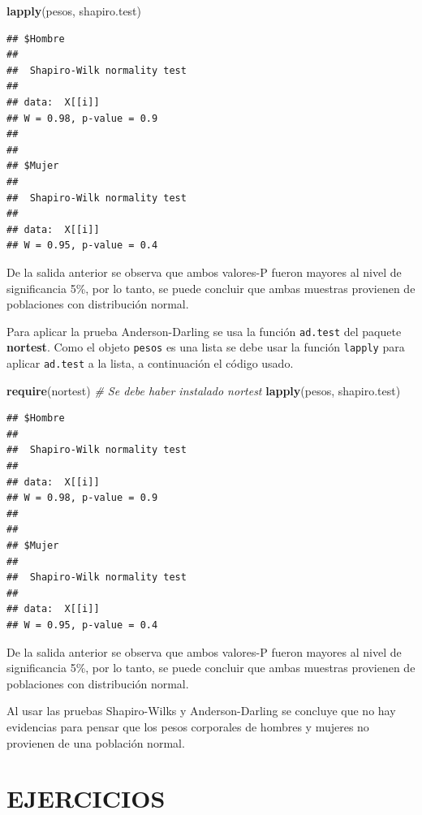 \documentclass[10pt,]{krantz}
\makeatletter
\newenvironment{Shaded}{\begin{snugshade}}{\end{snugshade}}
\newcommand{\KeywordTok}[1]{\textcolor[rgb]{0.13,0.29,0.53}{\textbf{#1}}}
\newcommand{\CommentTok}[1]{\textcolor[rgb]{0.56,0.35,0.01}{\textit{#1}}}
\newcommand{\NormalTok}[1]{#1}
\newenvironment{kframe}{%
\medskip{}
\setlength{\fboxsep}{.8em}
 \def\at@end@of@kframe{}%
 \ifinner\ifhmode%
  \def\at@end@of@kframe{\end{minipage}}%
  \begin{minipage}{\columnwidth}%
 \fi\fi%
 \def\FrameCommand##1{\hskip\@totalleftmargin \hskip-\fboxsep
 \colorbox{shadecolor}{##1}\hskip-\fboxsep
     \hskip-\linewidth \hskip-\@totalleftmargin \hskip\columnwidth}%
 \MakeFramed {\advance\hsize-\width
   \@totalleftmargin\z@ \linewidth\hsize
   \@setminipage}}%
 {\par\unskip\endMakeFramed%
 \at@end@of@kframe}
\renewenvironment{Shaded}{\begin{kframe}}{\end{kframe}}
\makeatother
\begin{document}
\begin{Shaded}
\begin{Highlighting}[]
\KeywordTok{lapply}\NormalTok{(pesos, shapiro.test)}
\end{Highlighting}
\end{Shaded}

\begin{verbatim}
## $Hombre
## 
##  Shapiro-Wilk normality test
## 
## data:  X[[i]]
## W = 0.98, p-value = 0.9
## 
## 
## $Mujer
## 
##  Shapiro-Wilk normality test
## 
## data:  X[[i]]
## W = 0.95, p-value = 0.4
\end{verbatim}

De la salida anterior se observa que ambos valores-P fueron mayores al
nivel de significancia 5\%, por lo tanto, se puede concluir que ambas
muestras provienen de poblaciones con distribución normal.

Para aplicar la prueba Anderson-Darling se usa la función
\texttt{ad.test} del paquete \textbf{nortest}. Como el objeto
\texttt{pesos} es una lista se debe usar la función \texttt{lapply} para
aplicar \texttt{ad.test} a la lista, a continuación el código usado.

\begin{Shaded}
\begin{Highlighting}[]
\KeywordTok{require}\NormalTok{(nortest) }\CommentTok{# Se debe haber instalado nortest}
\KeywordTok{lapply}\NormalTok{(pesos, shapiro.test)}
\end{Highlighting}
\end{Shaded}

\begin{verbatim}
## $Hombre
## 
##  Shapiro-Wilk normality test
## 
## data:  X[[i]]
## W = 0.98, p-value = 0.9
## 
## 
## $Mujer
## 
##  Shapiro-Wilk normality test
## 
## data:  X[[i]]
## W = 0.95, p-value = 0.4
\end{verbatim}

De la salida anterior se observa que ambos valores-P fueron mayores al
nivel de significancia 5\%, por lo tanto, se puede concluir que ambas
muestras provienen de poblaciones con distribución normal.

Al usar las pruebas Shapiro-Wilks y Anderson-Darling se concluye que no
hay evidencias para pensar que los pesos corporales de hombres y mujeres
no provienen de una población normal.

\section*{EJERCICIOS}\label{ejercicios-7}
\end{document}
